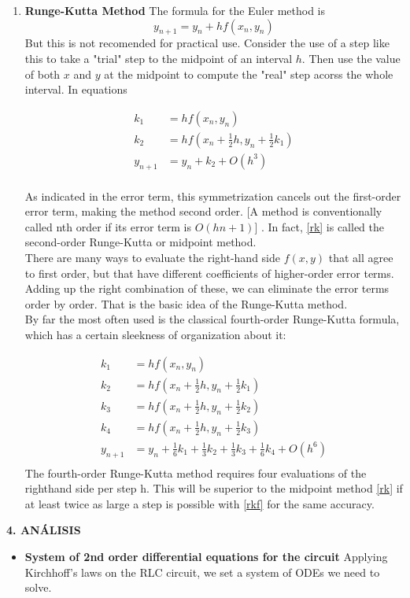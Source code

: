 \documentclass[10pt,a4paper]{article}
\begin{document}
\begin{multicols}{2}
\begin{enumerate}
\item \textbf{Runge-Kutta Method}
The formula for the Euler method is $$y_{n+1} = y_n + hf(x_n, y_n)$$ But this is not recomended for practical use. Consider the use of a step like this to take a "trial" step to the midpoint of an interval $h$. Then use the value of both $x$ and $y$ at the midpoint to compute the "real" step acorss the whole interval. In equations

\begin{align}
\nonumber k_1 &= hf(x_n, y_n) \\
\nonumber k_2 &= hf(x_n + \frac{1}{2}h,y_n + \frac{1}{2}k_1) \\
\nonumber y_{n+1} &= y_n + k_2 + O(h^3)\\
\label{rk}
\end{align}

As indicated in the error term, this symmetrization cancels out the first-order error term, making the method second order. [A method is conventionally called nth order if its error term is $O(hn+1)$] . In fact, \eqref{rk} is called the second-order Runge-Kutta or midpoint method.\\ 
There are many ways to evaluate the right-hand side $f(x,y)$ that all agree to first order, but that have different coefficients of higher-order error terms. Adding up the right combination of these, we can eliminate the error terms order by order. That is the basic idea of the Runge-Kutta method.\\
By far the most often used is the classical fourth-order Runge-Kutta formula, which has a certain sleekness of organization about it:

\begin{align}
\nonumber k_1 &= hf(x_n, y_n) \\
\nonumber k_2 &= hf(x_n + \frac{1}{2}h, y_n + \frac{1}{2}k_1) \\
\nonumber k_3 &= hf(x_n + \frac{1}{2}h, y_n + \frac{1}{2}k_2) \\
\nonumber k_4 &= hf(x_n + \frac{1}{2}h, y_n + \frac{1}{2}k_3) \\
\nonumber y_{n+1} &= y_n + \frac{1}{6}k_1 + \frac{1}{3}k_2 +\frac{1}{3}k_3 +\frac{1}{6}k_4 + O(h^6)\\
\label{rkf}
\end{align}
The fourth-order Runge-Kutta method requires four evaluations of the righthand side per step h. This will be superior to the midpoint method \eqref{rk} if at least twice as large a step is possible with \eqref{rkf} for the same accuracy.
\end{enumerate}

\begin{center}
{\large \bf 4. AN\'ALISIS}
\end{center}
\begin{itemize}
\item \textbf{System of 2nd order differential equations for the circuit}
Applying Kirchhoff's laws on the RLC circuit, we set a system of ODEs 
we need to solve.
\end{itemize}
\end{multicols}
\end{document}
